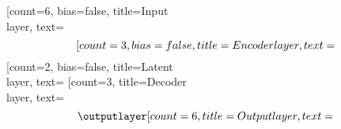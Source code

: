 	\begin{neuralnetwork}[height=6]
		\newcommand{\nodetextclear}[2]{}
		\newcommand{\nodetextx}[2]{$$}
		\newcommand{\nodetexty}[2]{$$}
		[count=6, bias=false, title=Input\\layer, text=\nodetextx]
		\inputlayer[count=3, bias=false, title=Encoder\\layer, text=\nodetextx]\linklayers
		\hiddenlayer[count=2, bias=false, title=Latent\\layer, text=\nodetextclear] \linklayers
		\outputlayer[count=3, title=Decoder\\layer, text=\nodetexty] \linklayers
		\outputlayer[count=6, title=Output\\layer, text=\nodetexty] \linklayers
	\end{neuralnetwork}
